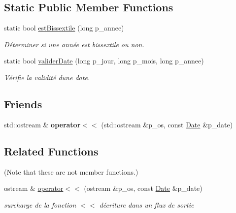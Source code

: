 \subsection*{Static Public Member Functions}
\begin{DoxyCompactItemize}
\item 
static bool \hyperlink{classutil_1_1Date_af80efec6a713cdb671d8b23c3e8c4efb}{est\+Bissextile} (long p\+\_\+annee)
\begin{DoxyCompactList}\small\item\em Déterminer si une année est bissextile ou non. \end{DoxyCompactList}\item 
static bool \hyperlink{classutil_1_1Date_af4b4dde01395754245a42483358cb538}{valider\+Date} (long p\+\_\+jour, long p\+\_\+mois, long p\+\_\+annee)
\begin{DoxyCompactList}\small\item\em Vérifie la validité d\textquotesingle{}une date. \end{DoxyCompactList}\end{DoxyCompactItemize}
\subsection*{Friends}
\begin{DoxyCompactItemize}
\item 
\mbox{\label{classutil_1_1Date_ab01372aff5a2aa1d5f5bab251bb7951c}} 
std\+::ostream \& {\bfseries operator$<$$<$} (std\+::ostream \&p\+\_\+os, const \hyperlink{classutil_1_1Date}{Date} \&p\+\_\+date)
\end{DoxyCompactItemize}
\subsection*{Related Functions}
(Note that these are not member functions.) \begin{DoxyCompactItemize}
\item 
ostream \& \hyperlink{classutil_1_1Date_a3b88f9a1692395518a45b282a19f10e8}{operator$<$$<$} (ostream \&p\+\_\+os, const \hyperlink{classutil_1_1Date}{Date} \&p\+\_\+date)
\begin{DoxyCompactList}\small\item\em surcharge de la fonction $<$$<$ d\textquotesingle{}écriture dans un flux de sortie \end{DoxyCompactList}\end{DoxyCompactItemize}


